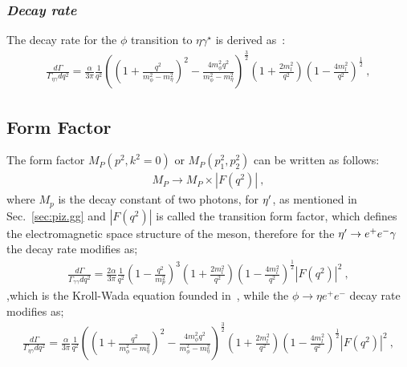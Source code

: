 \subsubsection{\emph{Decay rate}}
The decay rate for the $\phi$ transition to $\eta \gamma^\star$ is derived as~\cite{landsberg}:
\begin{align}
\frac{d\Gamma}{\Gamma_{\eta\gamma} dq^2} = \frac{\alpha}{3 \pi} \frac{1}{q^2} \left( \left(1+ \frac{q^2}{m_{\phi}^2 - m_{\eta}^2} \right)^2 - \frac{4 m_{\phi}^2 q^2}{m_{\phi}^2 - m_{\eta}^2}\right)^\frac{3}{2} \left( 1+ \frac{2m_l^2}{q^2}\right) \left( 1- \frac{4m_l^2}{q^2}\right)^{\frac{1}{2}} \ ,
\end{align}
\subsection{Form Factor}
The form factor ${M}_P(p^2,k^2=0)$ or ${M}_P(p_{1}^2,p_{2}^2)$  can be written as follows:
\begin{align}
 {M}_P \to {M}_P \times \left|F(q^2)\right| \ ,
\end{align}
where $M_p$ is the decay constant of two photons, for $\eta^{\prime}$, as mentioned in Sec.~\ref{sec:piz.gg} and $\left|F(q^2)\right|$ is called the transition form factor, which defines the electromagnetic space structure of the meson, therefore for the $\eta^{\prime} \to e^+e^- \gamma$ the decay rate modifies as;
\begin{align}\label{eq:eegff.final}
\frac{d\Gamma}{\Gamma_{\gamma\gamma} dq^2} = \frac{2 \alpha}{3 \pi} \frac{1}{q^2} \left( 1- \frac{q^2}{m_p^2}\right)^3 \left( 1+ \frac{2m_l^2}{q^2}\right) \left( 1- \frac{4m_l^2}{q^2}\right)^{\frac{1}{2}} \left|F(q^2)\right|^2 \ ,
\end{align}
,which is the Kroll-Wada equation founded in~\cite{KrollWada}, while the $\phi \to \eta e^+e^-$ decay rate modifies as;
\begin{align}
\frac{d\Gamma}{\Gamma_{\eta\gamma} dq^2} = \frac{\alpha}{3 \pi} \frac{1}{q^2} \left( \left(1+ \frac{q^2}{m_{\phi}^2 - m_{\eta}^2} \right)^2 - \frac{4 m_{\phi}^2 q^2}{m_{\phi}^2 - m_{\eta}^2}\right)^\frac{3}{2} \left( 1+ \frac{2m_l^2}{q^2}\right) \left( 1- \frac{4m_l^2}{q^2}\right)^{\frac{1}{2}} \left|F(q^2)\right|^2 \ ,
\end{align}

